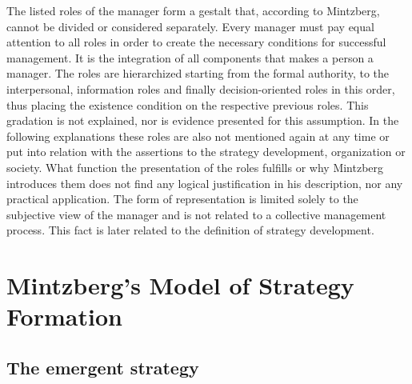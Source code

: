 \documentclass[a4paper,12pt]{article}
\begin{document}
The listed roles of the manager form a gestalt that, according to Mintzberg,
cannot be divided or considered separately. Every manager must pay equal
attention to all roles in order to create the necessary conditions for
successful management. It is the integration of all components that makes a
person a manager. The roles are hierarchized starting from the formal
authority, to the interpersonal, information roles and finally
decision-oriented roles in this order, thus placing the existence condition on
the respective previous roles. This gradation is not explained, nor is
evidence presented for this assumption. In the following explanations these
roles are also not mentioned again at any time or put into relation with the
assertions to the strategy development, organization or society. What function
the presentation of the roles fulfills or why Mintzberg introduces them does
not find any logical justification in his description, nor any practical
application. The form of representation is limited solely to the subjective
view of the manager and is not related to a collective management
process. This fact is later related to the definition of strategy development.


\section{Mintzberg's Model of Strategy Formation}

\subsection{The emergent strategy}
\end{document}
